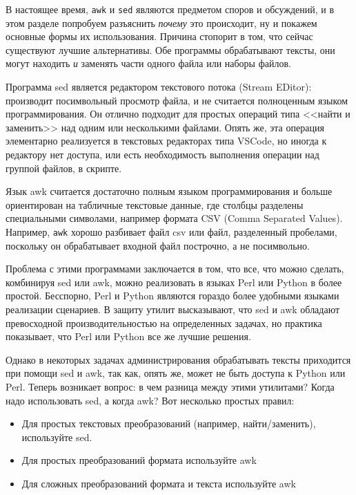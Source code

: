 \documentclass[12pt]{article}
\providecommand{\tightlist}{%
  \setlength{\itemsep}{0pt}\setlength{\parskip}{0pt}}
\begin{document}
В настоящее время, \texttt{awk} и \texttt{sed} являются предметом споров
и обсуждений, и в этом разделе попробуем разъяснить \emph{почему} это
происходит, ну и покажем основные формы их использования. Причина
стопорит в том, что сейчас существуют лучшие альтернативы. Обе
программы обрабатывают тексты, они могут находить \emph{и} заменять
части одного файла или наборы файлов.

Программа sed является редактором текстового потока (Stream EDitor):
производит посимвольный просмотр файла, и не считается полноценным
языком программирования. Он отлично подходит для простых операций типа
<<найти и заменить>> над одним или несколькими файлами. Опять же, эта
операция элементарно реализуется в текстовых редакторах типа VSCode, но
иногда к редактору нет доступа, или есть необходимость выполнения
операции над группой файлов, в скрипте.

Язык awk считается достаточно полным языком программирования и больше ориентирован на табличные текстовые данные, где
столбцы разделены специальными символами, например формата CSV (Comma
Separated Values). Например, \texttt{awk} хорошо разбивает файл csv или
файл, разделенный пробелами, поскольку он обрабатывает входной файл
построчно, а не посимвольно.

Проблема с этими программами заключается в том, что все, что можно
сделать, комбинируя sed или awk, можно реализовать в языках Perl или
Python в более простой. Бесспорно, Perl и Python являются гораздо более
удобными языками реализации сценариев. В защиту утилит высказывают, что
sed и awk обладают превосходной производительностью на определенных
задачах, но практика показывает, что Perl или Python все же лучшие
решения.

Однако в некоторых задачах администрирования обрабатывать тексты
приходится при помощи sed и awk, так как, опять же, может не быть
доступа к Python или Perl. Теперь возникает вопрос: в чем разница между
этими утилитами? Когда надо использовать sed, а когда awk? Вот несколько
простых правил:

\begin{itemize}
\tightlist
\item
  Для простых текстовых преобразований (например, найти/заменить),
  используйте sed.
\item
  Для простых преобразований формата используйте awk
\item
  Для сложных преобразований формата и текста используйте awk
\end{itemize}
\end{document}
